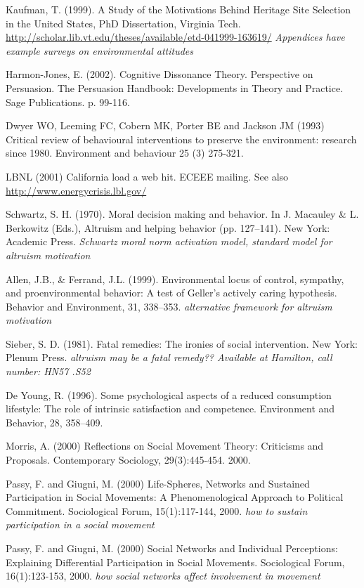 Kaufman, T. (1999). A Study of the Motivations Behind Heritage Site Selection in the United States, PhD Dissertation, Virginia Tech. \url{http://scholar.lib.vt.edu/theses/available/etd-041999-163619/} \emph{Appendices have example surveys on environmental attitudes}

Harmon-Jones, E. (2002). Cognitive Dissonance Theory. Perspective on Persuasion. The Persuasion Handbook:  Developments in Theory and Practice. Sage Publications. p. 99-116.

Dwyer WO, Leeming FC, Cobern MK, Porter BE and Jackson JM (1993) Critical review of behavioural interventions to preserve the environment: research since 1980. Environment and behaviour 25 (3) 275-321.

LBNL (2001) California load a web hit. ECEEE mailing. See also \url{http://www.energycrisis.lbl.gov/}

Schwartz, S. H. (1970). Moral decision making and behavior. In J. Macauley \& L. Berkowitz (Eds.), Altruism and helping behavior (pp. 127–141). New York: Academic Press. \emph{Schwartz moral norm activation model, standard model for altruism motivation}

Allen, J.B., \& Ferrand, J.L. (1999). Environmental locus of control, sympathy, and proenvironmental behavior: A test of Geller’s actively caring hypothesis. Behavior and Environment, 31, 338–353. \emph{alternative framework for altruism motivation}

Sieber, S. D. (1981). Fatal remedies: The ironies of social intervention. New York: Plenum Press. \emph{altruism may be a fatal remedy?? Available at Hamilton, call number: HN57 .S52}

De Young, R. (1996). Some psychological aspects of a reduced consumption lifestyle: The role of intrinsic satisfaction and competence. Environment and Behavior, 28, 358–409.

Morris, A. (2000) Reflections on Social Movement Theory: Criticisms and Proposals. Contemporary Sociology, 29(3):445-454. 2000.

Passy, F. and Giugni, M. (2000) Life-Spheres, Networks and Sustained Participation in Social Movements: A Phenomenological Approach to Political Commitment. Sociological Forum, 15(1):117-144, 2000. \emph{how to sustain participation in a social movement}

Passy, F. and Giugni, M. (2000) Social Networks and Individual Perceptions: Explaining Differential Participation in Social Movements. Sociological Forum, 16(1):123-153, 2000. \emph{how social networks affect involvement in movement}


